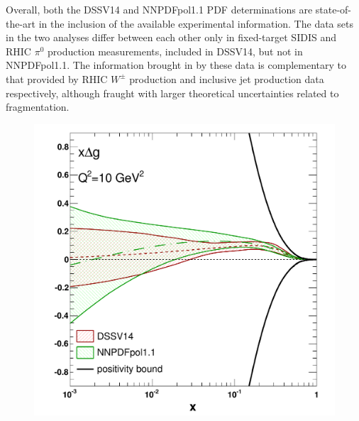 Overall, both the DSSV14 and NNPDFpol1.1 PDF determinations are 
state-of-the-art in the inclusion of the available experimental information. 
%
The data sets in the two analyses differ between each other only in
fixed-target SIDIS and RHIC $\pi^0$ production measurements, included in 
DSSV14, but not in NNPDFpol1.1. 
%
The information brought in by these data is complementary to that provided by 
RHIC $W^\pm$ production and inclusive jet production data respectively,
although fraught with larger theoretical uncertainties related to fragmentation.

\begin{figure}[!t]
\centering
\includegraphics[scale=0.33,clip=true,trim= 0 -1.3cm 0 0]{plots/gluoncomp}

\end{figure}
